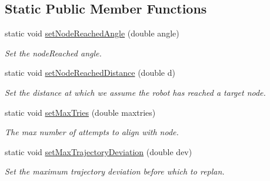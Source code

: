 \subsection*{\-Static \-Public \-Member \-Functions}
\begin{DoxyCompactItemize}
\item 
\hypertarget{class_controller_a665b0a9cab38c11e575681944e2c8d8a}{static void \hyperlink{class_controller_a665b0a9cab38c11e575681944e2c8d8a}{set\-Node\-Reached\-Angle} (double angle)}\label{class_controller_a665b0a9cab38c11e575681944e2c8d8a}

\begin{DoxyCompactList}\small\item\em \-Set the node\-Reached angle. \end{DoxyCompactList}\item 
\hypertarget{class_controller_a5d394a75a6d1cf325fda099b23c91a2f}{static void \hyperlink{class_controller_a5d394a75a6d1cf325fda099b23c91a2f}{set\-Node\-Reached\-Distance} (double d)}\label{class_controller_a5d394a75a6d1cf325fda099b23c91a2f}

\begin{DoxyCompactList}\small\item\em \-Set the distance at which we assume the robot has reached a target node. \end{DoxyCompactList}\item 
\hypertarget{class_controller_a2e27a2fbd5d1c83d918e05da91302863}{static void \hyperlink{class_controller_a2e27a2fbd5d1c83d918e05da91302863}{set\-Max\-Tries} (double maxtries)}\label{class_controller_a2e27a2fbd5d1c83d918e05da91302863}

\begin{DoxyCompactList}\small\item\em \-The max number of attempts to align with node. \end{DoxyCompactList}\item 
\hypertarget{class_controller_aacd25b8b49bcec685b0ec284bb9694d6}{static void \hyperlink{class_controller_aacd25b8b49bcec685b0ec284bb9694d6}{set\-Max\-Trajectory\-Deviation} (double dev)}\label{class_controller_aacd25b8b49bcec685b0ec284bb9694d6}

\begin{DoxyCompactList}\small\item\em \-Set the maximum trajectory deviation before which to replan. \end{DoxyCompactList}\end{DoxyCompactItemize}
